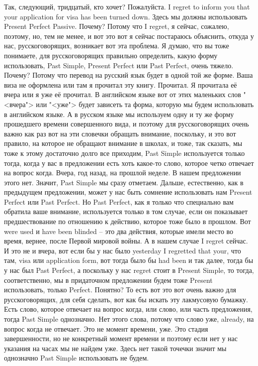 \documentclass[main.tex]{subfiles}
\begin{document}
Так, следующий, тридцатый, кто хочет? Пожалуйста.
I regret to inform you that your application for visa has been turned down.
Здесь мы должны использовать Present Perfect Passive.
Почему? Потому что I regret, я сейчас, сожалею, поэтому, но, тем не менее, и вот это вот я сейчас постараюсь объяснить, откуда у нас, русскоговорящих, возникает вот эта проблема.
Я думаю, что вы тоже понимаете, для русскоговорящих правильно определить, какую форму использовать, Past Simple, Present Perfect или Past Perfect, очень тяжело.
Почему? Потому что перевод на русский язык будет в одной той же форме.
Ваша виза не оформлена или там я прочитал эту книгу.
Прочитал.
Я прочитала её вчера или я уже её прочитал.
В английском языке вот от этих маленьких слов "<вчера"> или "<уже"> будет зависеть та форма, которую мы будем использовать в английском языке.
А в русском языке мы используем одну и ту же форму прошедшего времени совершенного вида, и поэтому для русскоговорящих очень важно как раз вот на эти словечки обращать внимание, поскольку, и это вот правило, на которое не обращают внимание в школах, и тоже, так сказать, мы тоже к этому достаточно долго все приходим, Past Simple используется только тогда, когда у вас в предложении есть хоть какое-то слово, которое четко отвечает на вопрос когда.
Вчера, год назад, на прошлой неделе.
В нашем предложении этого нет.
Значит, Past Simple мы сразу отметаем.
Дальше, естественно, как в предыдущем предложении, может у нас быть сомнение использовать нам Present Perfect или Past Perfect.
Но Past Perfect, как я только что специально вам обратила ваше внимание, используется только в том случае, если он показывает предшествование по отношению к действию, которое тоже было в прошлом.
Вот were used и have been blinded -- это два действия, которые имели место во время, вернее, после Первой мировой войны.
А в нашем случае I regret сейчас.
И это не и вчера, вот если бы у нас было yesterday I regretted that your, что там, visa или application form, вот тогда было бы had been и так далее, тогда бы у нас был Past Perfect, а поскольку у нас regret стоит в Present Simple, то тогда, соответственно, мы в придаточном предложении будем тоже Present использовать, только Perfect.
Понятно? То есть вот это вот очень важно для русскоговорящих, для себя сделать, вот как бы искать эту лакмусовую бумажку.
Есть слово, которое отвечает на вопрос когда, или слово, или часть предложения, тогда Past Simple однозначно.
Нет этого слова, потому что слово уже, already, на вопрос когда не отвечает.
Это не момент времени, уже.
Это стадия завершенности, но не конкретный момент времени и поэтому если нет у нас указания на часах мы не найдем уже.
Здесь нет такой точечки значит мы однозначно Past Simple использовать не будем.
\end{document}

